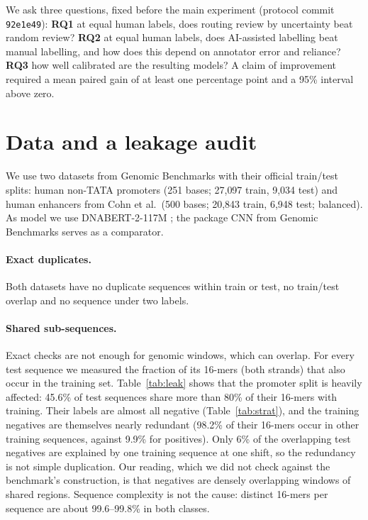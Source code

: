 \documentclass[11pt]{article}
\begin{document}
We ask three questions, fixed before the main experiment (protocol commit \texttt{92e1e49}):
\textbf{RQ1} at equal human labels, does routing review by uncertainty beat random review?
\textbf{RQ2} at equal human labels, does AI-assisted labelling beat manual labelling, and how does this depend on annotator error and reliance?
\textbf{RQ3} how well calibrated are the resulting models?
A claim of improvement required a mean paired gain of at least one percentage point and a 95\% interval above zero.

\section{Data and a leakage audit}
We use two datasets from Genomic Benchmarks \citep{gresova2023} with their official train/test splits: human non-TATA promoters (251 bases; 27{,}097 train, 9{,}034 test) and human enhancers from Cohn et al.\ (500 bases; 20{,}843 train, 6{,}948 test; balanced). As model we use DNABERT-2-117M \citep{zhou2024dnabert2}; the package CNN from Genomic Benchmarks serves as a comparator.

\paragraph{Exact duplicates.} Both datasets have no duplicate sequences within train or test, no train/test overlap and no sequence under two labels.

\paragraph{Shared sub-sequences.} Exact checks are not enough for genomic windows, which can overlap. For every test sequence we measured the fraction of its 16-mers (both strands) that also occur in the training set. Table~\ref{tab:leak} shows that the promoter split is heavily affected: 45.6\% of test sequences share more than 80\% of their 16-mers with training. Their labels are almost all negative (Table~\ref{tab:strat}), and the training negatives are themselves nearly redundant (98.2\% of their 16-mers occur in other training sequences, against 9.9\% for positives). Only 6\% of the overlapping test negatives are explained by one training sequence at one shift, so the redundancy is not simple duplication. Our reading, which we did not check against the benchmark's construction, is that negatives are densely overlapping windows of shared regions. Sequence complexity is not the cause: distinct 16-mers per sequence are about 99.6--99.8\% in both classes.
\end{document}
